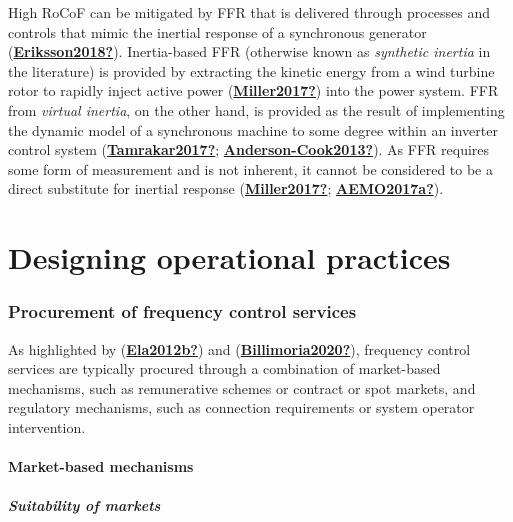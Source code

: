 \documentclass[12pt,a4paper,]{report}
\begin{document}
High RoCoF can be mitigated by FFR that is delivered through processes
and controls that mimic the inertial response of a synchronous generator
(\protect\hyperlink{ref-Eriksson2018}{\textbf{Eriksson2018?}}).
Inertia-based FFR (otherwise known as \emph{synthetic inertia} in the
literature) is provided by extracting the kinetic energy from a wind
turbine rotor to rapidly inject active power
(\protect\hyperlink{ref-Miller2017}{\textbf{Miller2017?}}) into the
power system. FFR from \emph{virtual inertia}, on the other hand, is
provided as the result of implementing the dynamic model of a
synchronous machine to some degree within an inverter control system
(\protect\hyperlink{ref-Tamrakar2017}{\textbf{Tamrakar2017?}};
\protect\hyperlink{ref-Anderson-Cook2013}{\textbf{Anderson-Cook2013?}}).
As FFR requires some form of measurement and is not inherent, it cannot
be considered to be a direct substitute for inertial response
(\protect\hyperlink{ref-Miller2017}{\textbf{Miller2017?}};
\protect\hyperlink{ref-AEMO2017a}{\textbf{AEMO2017a?}}).

\hypertarget{designing-operational-practices}{%
\section{Designing operational
practices}\label{designing-operational-practices}}

\hypertarget{sec:procurement}{%
\subsubsection{Procurement of frequency control
services}\label{sec:procurement}}

As highlighted by (\protect\hyperlink{ref-Ela2012b}{\textbf{Ela2012b?}})
and (\protect\hyperlink{ref-Billimoria2020}{\textbf{Billimoria2020?}}),
frequency control services are typically procured through a combination
of market-based mechanisms, such as remunerative schemes or contract or
spot markets, and regulatory mechanisms, such as connection requirements
or system operator intervention.

\hypertarget{sec:market_mech}{%
\paragraph{Market-based mechanisms}\label{sec:market_mech}}

\hypertarget{suitability-of-markets}{%
\subparagraph{Suitability of markets}\label{suitability-of-markets}}
\end{document}
